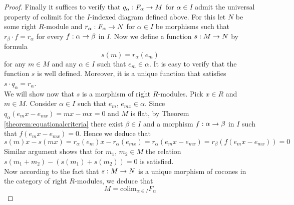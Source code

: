\begin{proof}
Finally it suffices to verify that $q_{\alpha}:F_{\alpha}\rightarrow M$ for $\alpha\in I$ admit the universal property of colimit for the $I$-indexed diagram defined above. For this let $N$ be some right $R$-module and $r_{\alpha}:F_{\alpha}\rightarrow N$ for $\alpha\in I$ be morphisms such that $r_{\beta}\cdot f=r_{\alpha}$ for every $f:\alpha\rightarrow \beta$ in $I$. Now we define a function $s:M\rightarrow N$ by formula
$$s(m)=r_{\alpha}(e_m)$$
for any $m\in M$ and any $\alpha\in I$ such that $e_m\in \alpha$. It is easy to verify that the function $s$ is well defined. Moreover, it is a unique function that satisfies $s\cdot q_{\alpha}=r_\alpha$.\\
We will show now that $s$ is a morphism of right $R$-modules. Pick $x\in R$ and $m\in M$. Consider $\alpha\in I$ such that $e_m$, $e_{mx}\in \alpha$. Since $q_{\alpha}(e_mx-e_{mx})=mx-mx=0$ and $M$ is flat, by Theorem \ref{theorem:equationalcriteria} there exist $\beta\in I$ and a morphism $f:\alpha \rightarrow \beta$ in $I$ such that $f(e_mx-e_{mx})=0$. Hence we deduce that
$$s(m)x-s(mx)=r_{\alpha}(e_m)x-r_{\alpha}(e_{mx})=r_{\alpha}(e_mx-e_{mx})=r_{\beta}\left(f\left(e_mx-e_{mx}\right)\right)=0$$
Similar argument shows that for $m_1$, $m_2\in M$ the relation $s(m_1+m_2)-\left(s(m_1)+s(m_2)\right)=0$ is satisfied.\\
Now according to the fact that $s:M\rightarrow N$ is a unique morphism of cocones in the category of right $R$-modules, we deduce that 
$$M=\mathrm{colim}_{\alpha\in I}F_{\alpha}$$
\end{proof}

